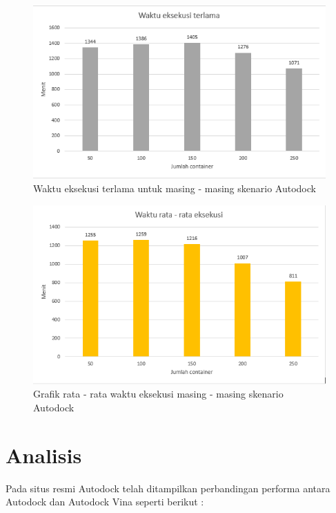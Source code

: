 \begin{figure}
	\includegraphics{terlama_dock.PNG}
	\caption{Waktu eksekusi terlama untuk masing - masing skenario Autodock}
\end{figure}

\begin{figure}
	\includegraphics{ratarata_dock.PNG}
	\caption{Grafik rata - rata waktu eksekusi masing - masing skenario Autodock}
\end{figure}

\section{Analisis}
\hspace{0.5cm}Pada situs resmi Autodock telah ditampilkan perbandingan performa antara Autodock dan Autodock Vina \cite{comparison_dockvina} seperti berikut :
 
